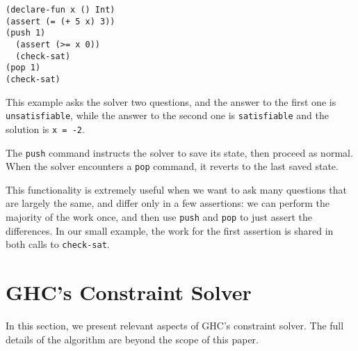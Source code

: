 \documentclass{sigplanconf}
\begin{document}
\begin{Verbatim}
(declare-fun x () Int)
(assert (= (+ 5 x) 3))
(push 1)
  (assert (>= x 0))
  (check-sat)
(pop 1)
(check-sat)
\end{Verbatim}

This example asks the solver two questions, and the answer to the first
one is \Verb"unsatisfiable", while the answer to the second one is
\Verb"satisfiable" and the solution is \Verb"x = -2".

The \Verb"push" command instructs the solver to save its state, then
proceed as normal.  When the solver encounters a \Verb"pop" command,
it reverts to the last saved state.

This functionality is extremely useful when we want to ask many questions
that are largely the same, and differ only in a few assertions:
we can perform the majority of the work once, and then use
\Verb"push" and \Verb"pop" to just assert the differences.
In our small example, the work for the first assertion is shared in
both calls to \Verb"check-sat".





\section{GHC's Constraint Solver}
\label{GHC}

In this section, we present relevant aspects of GHC's constraint solver.
The full details of the algorithm \cite{outsidein} are beyond the scope
of this paper.
\end{document}
